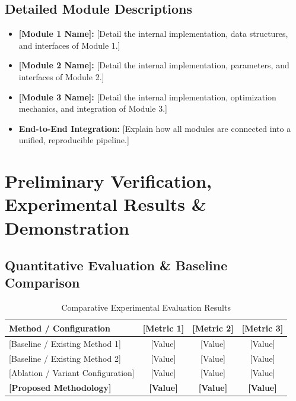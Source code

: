 \documentclass[11pt, a4paper]{article}
\begin{document}
\subsection{Detailed Module Descriptions}
\begin{itemize}[noitemsep, topsep=2pt]
    \item \textbf{[Module 1 Name]:} {[Detail the internal implementation, data structures, and interfaces of Module 1.]}
    \item \textbf{[Module 2 Name]:} {[Detail the internal implementation, parameters, and interfaces of Module 2.]}
    \item \textbf{[Module 3 Name]:} {[Detail the internal implementation, optimization mechanics, and integration of Module 3.]}
    \item \textbf{End-to-End Integration:} {[Explain how all modules are connected into a unified, reproducible pipeline.]}
\end{itemize}

\section{Preliminary Verification, Experimental Results \& Demonstration}

\subsection{Quantitative Evaluation \& Baseline Comparison}

\begin{table}[H]
    \centering
    \footnotesize
    \renewcommand{\arraystretch}{1.25}
    \begin{tabular}{|p{5.0cm}|c|c|c|}
        \hline
        \textbf{Method / Configuration} & \textbf{[Metric 1]} & \textbf{[Metric 2]} & \textbf{[Metric 3]} \\
        \hline
        {[Baseline / Existing Method 1]} & {[Value]} & {[Value]} & {[Value]} \\
        \hline
        {[Baseline / Existing Method 2]} & {[Value]} & {[Value]} & {[Value]} \\
        \hline
        {[Ablation / Variant Configuration]} & {[Value]} & {[Value]} & {[Value]} \\
        \hline
        \textbf{[Proposed Methodology]} & \textbf{[Value]} & \textbf{[Value]} & \textbf{[Value]} \\
        \hline
    \end{tabular}
    \caption{Comparative Experimental Evaluation Results}
\end{table}
\end{document}
